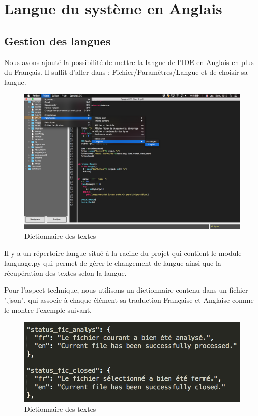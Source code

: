 \documentclass[a4paper,12pt]{article}
\begin{document}

\section{Langue du système en Anglais}

	\subsection{Gestion des langues}

	Nous avons ajouté la possibilité de mettre la langue de l'IDE en Anglais en plus du Français. Il suffit d'aller dans : Fichier/Paramètres/Langue et de choisir sa langue.\\
	
	\begin{figure}[h!]
			\begin{center}
					\includegraphics[scale=0.3]{images/langues}
					\caption{Dictionnaire des textes}
			\end{center}
	\end{figure}
	
	Il y a un répertoire langue situé à la racine du projet qui contient le module language.py qui permet de gérer le changement de langue ainsi que la récupération des textes selon la langue.
	
	Pour l'aspect technique, nous utilisons un dictionnaire contenu dans un fichier ".json", qui associe à chaque élément sa traduction Française et Anglaise comme le montre l'exemple suivant.
	
	\begin{figure}[h!]
			\begin{center}
					\includegraphics[scale=1]{images/langue_json}
					\caption{Dictionnaire des textes}
			\end{center}
	\end{figure}
	
\end{document}
